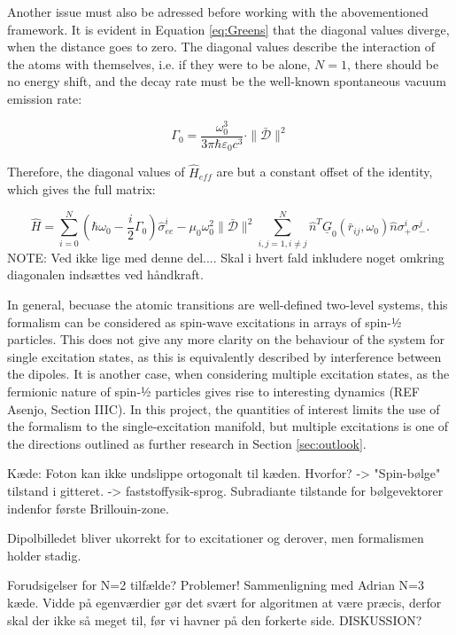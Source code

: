 \documentclass{article}
\begin{document}
Another issue must also be adressed before working with the abovementioned framework. It is evident in Equation \ref{eq:Greens} that the diagonal values diverge, when the distance goes to zero. The diagonal values describe the interaction of the atoms with themselves, i.e. if they were to be alone, $N = 1$, there should be no energy shift, and the decay rate must be the well-known spontaneous vacuum emission rate:

\begin{equation}\label{eq:vac_emission_rate}
    \Gamma_0 = \frac{\omega_0^3}{3\pi \hbar \varepsilon_0 c^3} \cdot \|\bar{\mathscr{D}}\|^2
\end{equation}

Therefore, the diagonal values of $\hat{H}_{eff}$ are but a constant offset of the identity, which gives the full matrix:

\begin{equation}
    \hat{H} = \sum_{i=0}^N (\hbar \omega_0 - \frac{i}{2}\Gamma_0) \hat{\sigma}_{ee}^{i} -\mu_0 \omega_0^2 \|\bar{\mathscr{D}}\|^2 \sum_{i,j = 1, i \neq j}^N \hat{n}^T \underline{G}_0(\bar{r}_{ij}, \omega_0) \hat{n} \sigma_+^i \sigma_-^j.
\end{equation}
NOTE: Ved ikke lige med denne del.... Skal i hvert fald inkludere noget omkring diagonalen indsættes ved håndkraft.

In general, becuase the atomic transitions are well-defined two-level systems, this formalism can be considered as spin-wave excitations in arrays of spin-½ particles. This does not give any more clarity on the behaviour of the system for single excitation states, as this is equivalently described by interference between the dipoles. It is another case, when considering multiple excitation states, as the fermionic nature of spin-½ particles gives rise to interesting dynamics (REF Asenjo, Section IIIC). In this project, the quantities of interest limits the use of the formalism to the single-excitation manifold, but multiple excitations is one of the directions outlined as further research in Section \ref{sec:outlook}. 

Kæde: Foton kan ikke undslippe ortogonalt til kæden. Hvorfor? -> "Spin-bølge" tilstand i gitteret. -> faststoffysik-sprog. Subradiante tilstande for bølgevektorer indenfor første Brillouin-zone. 

Dipolbilledet bliver ukorrekt for to excitationer og derover, men formalismen holder stadig. 

Forudsigelser for N=2 tilfælde? Problemer! Sammenligning med Adrian N=3 kæde. Vidde på egenværdier gør det svært for algoritmen at være præcis, derfor skal der ikke så meget til, før vi havner på den forkerte side.  DISKUSSION?
\end{document}
